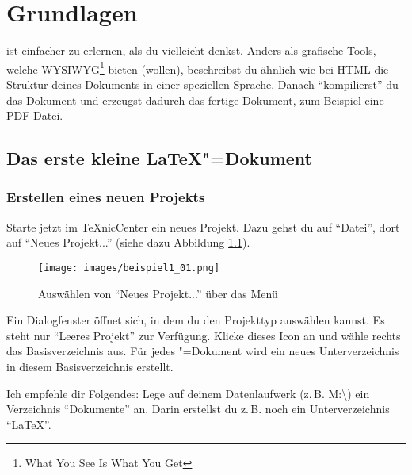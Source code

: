 %
%

\chapter{Grundlagen}
\label{sec:grundlagen}

\DMLLaTeX{} ist einfacher zu erlernen, als du vielleicht denkst. Anders als grafische Tools, welche WYSIWYG\footnote{What You See Is What You Get} bieten (wollen), beschreibst du ähnlich wie bei HTML die Struktur deines Dokuments in einer speziellen Sprache. Danach \enquote{kompilierst} du das Dokument und erzeugst dadurch das fertige Dokument, zum Beispiel eine PDF-Datei.


\section{Das erste kleine LaTeX"=Dokument}

\subsection{Erstellen eines neuen Projekts}
\label{sec:erstellenneuesprojekt}

Starte jetzt im TeXnicCenter ein neues Projekt. Dazu gehst du auf \enquote{Datei}, dort auf \enquote{Neues Projekt...} (siehe dazu Abbildung \ref{fig:beispiel1_01}).

\begin{figure}[ht]
	\begin{center}
		\texttt{[image: images/beispiel1\_01.png]}
	\end{center}
	\caption{Auswählen von \enquote{Neues Projekt...} über das Menü}
	\label{fig:beispiel1_01}
\end{figure}


Ein Dialogfenster öffnet sich, in dem du den Projekttyp auswählen kannst. Es steht nur \enquote{Leeres Projekt} zur Verfügung. Klicke dieses Icon an und wähle rechts das Basisverzeichnis aus. Für jedes \DMLLaTeX"=Dokument wird ein neues Unterverzeichnis in diesem Basisverzeichnis erstellt.

Ich empfehle dir Folgendes: Lege auf deinem Datenlaufwerk (z.\,B. M:\textbackslash ) ein Verzeichnis \enquote{Dokumente} an. Darin erstellst du z.\,B. noch ein Unterverzeichnis \enquote{LaTeX}.

